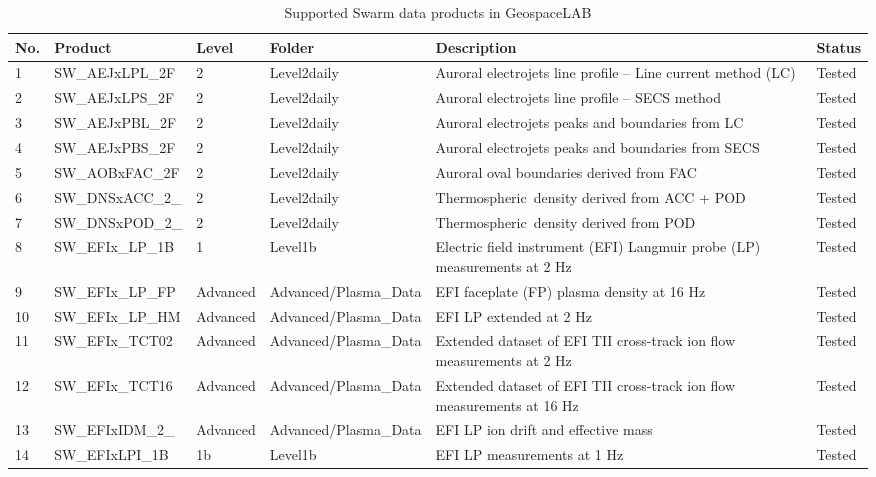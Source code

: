 \begin{table}
\centering
\caption[]{Supported Swarm data products in GeospaceLAB}
\label{tab:swarm-products}
\begin{tabular}{p{}p{}p{}p{}p{}p{}}
\toprule
No. & Product & Level & Folder & Description & Status \\
\hline
1 & SW\_AEJxLPL\_2F & 2 & Level2daily & Auroral electrojets line profile -- Line current method (LC) & Tested \\
2 & SW\_AEJxLPS\_2F & 2 & Level2daily & Auroral electrojets line profile -- SECS method & Tested \\
3 & SW\_AEJxPBL\_2F & 2 & Level2daily & Auroral electrojets peaks and boundaries from LC & Tested \\
4 & SW\_AEJxPBS\_2F & 2 & Level2daily & Auroral electrojets peaks and boundaries from SECS & Tested \\
5 & SW\_AOBxFAC\_2F & 2 & Level2daily & Auroral oval boundaries derived from FAC & Tested \\
6 & SW\_DNSxACC\_2\_ & 2 & Level2daily & Thermospheric~density derived from ACC + POD & Tested \\
7 & SW\_DNSxPOD\_2\_ & 2 & Level2daily & Thermospheric~density derived from POD & Tested \\
8 & SW\_EFIx\_LP\_1B & 1 & Level1b & Electric field instrument (EFI) Langmuir probe (LP) measurements at 2 Hz & Tested \\
9 & SW\_EFIx\_LP\_FP & Advanced & Advanced/Plasma\_Data & EFI faceplate (FP) plasma density at 16 Hz & Tested \\
10 & SW\_EFIx\_LP\_HM & Advanced & Advanced/Plasma\_Data & EFI LP extended at 2 Hz & Tested \\
11 & SW\_EFIx\_TCT02 & Advanced & Advanced/Plasma\_Data & Extended dataset of EFI TII cross-track ion flow measurements at 2 Hz & Tested \\
12 & SW\_EFIx\_TCT16 & Advanced & Advanced/Plasma\_Data & Extended dataset of EFI TII cross-track ion flow measurements at 16 Hz & Tested \\
13 & SW\_EFIxIDM\_2\_ & Advanced & Advanced/Plasma\_Data & EFI LP ion drift and effective mass & Tested \\
14 & SW\_EFIxLPI\_1B & 1b & Level1b & EFI LP measurements at 1 Hz & Tested \\

\end{tabular}
\end{table}
